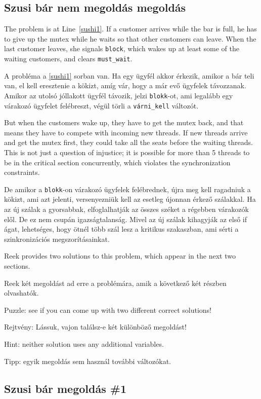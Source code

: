 \documentclass{book}
\newcommand{\clearemptydoublepage}{\newpage\cleardoublepage}
\begin{document}
\clearemptydoublepage
\subsection{Szusi bár nem megoldás megoldás}

The problem is at Line~\ref{sushi1}.  If a customer arrives
while the bar is full, he has to give up the mutex while he
waits so that other customers can leave.  When the last customer
leaves, she signals {\tt block}, which wakes up at least some
of the waiting customers, and clears {\tt must\_wait}.

A probléma a \ref{sushi1} sorban van. Ha egy ügyfél akkor
érkezik, amikor a bár teli van, el kell eresztenie a kökizt,
amíg vár, hogy a már evő ügyfelek távozzanak.
Amikor az utolsó jóllakott ügyfél távozik, jelzi {\tt blokk}-ot,
ami legalább egy várakozó ügyfelet felébreszt, végül törli
a {\tt várni\_kell} változót.

But when the customers wake up, they have to get the mutex
back, and that means they have to compete with incoming new
threads.  If new threads arrive and get the mutex first,
they could take all the seats before the waiting threads.
This is not just a question of injustice; it is possible for more
than 5 threads to be in the critical section concurrently, which
violates the synchronization constraints.

De amikor a {\tt blokk}-on várakozó ügyfelek felébrednek,
újra meg kell ragadniuk a kökizt, ami azt jelenti, versenyezniük kell
az esetleg újonnan érkező szálakkal. Ha az új szálak a gyorsabbak,
elfoglalhatják az összes széket a régebben várakozók elől.
De ez nem csupán igazságtalanság. Mivel az új szálak kihagyják
az első if ágat, lehetséges, hogy ötnél több szál lesz a kritikus
szakaszban, ami sérti a szinkronizációs megszorításainkat.

Reek provides two solutions to this problem, which appear
in the next two sections.

Reek két megoldást ad erre a problémára, amik a következő
két részben olvashatók.

Puzzle: see if you can come up with two different correct solutions!

Rejtvény: Lássuk, vajon találsz-e két különböző megoldást!

Hint: neither solution uses any additional variables.

Tipp: egyik megoldás sem használ további változókat.

\clearemptydoublepage
\subsection{Szusi bár megoldás \#1}
\end{document}
